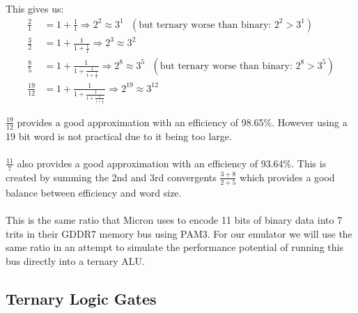 \documentclass[12pt]{article}
\begin{document}
This gives us:
\begin{align*}
    \frac{2}{1} &= 1 + \frac{1}{1} \Rightarrow 2^{2} \approx 3^{1} \text {  } (\text{but ternary worse than binary: } 2^{2} > 3^{1})\\
    \frac{3}{2} &= 1 + \frac{1}{1 + \frac{1}{1}} \Rightarrow 2^{3} \approx 3^{2} \\
    \frac{8}{5} &= 1 + \frac{1}{1 + \frac{1}{1 + \frac{1}{1}}} \Rightarrow 2^{8} \approx 3^{5} \text {  } (\text{but ternary worse than binary: } 2^{8} > 3^{5})\\
    \frac{19}{12} &= 1 + \frac{1}{1 + \frac{1}{1 + \frac{1}{1 + \frac{1}{2}}}} \Rightarrow 2^{19} \approx 3^{12}
\end{align*}

$\frac{19}{12}$ provides a good approximation with an efficiency of 98.65\%. However using a 19 bit word is not practical due to it being 
too large.\\
\\
$\frac{11}{7}$ also provides a good approximation with an efficiency of 93.64\%. This is created by summing the 2nd and 3rd convergents
$\frac{3+8}{2+5}$ which provides a good balance between efficiency and word size.\\
\\
This is the same ratio that Micron uses to encode 11 bits of binary data into 7 trits in their GDDR7 memory bus using PAM3.
For our emulator we will use the same ratio in an attempt to simulate the performance potential of running this bus directly into a ternary ALU.\\

\subsection{Ternary Logic Gates}
\end{document}
